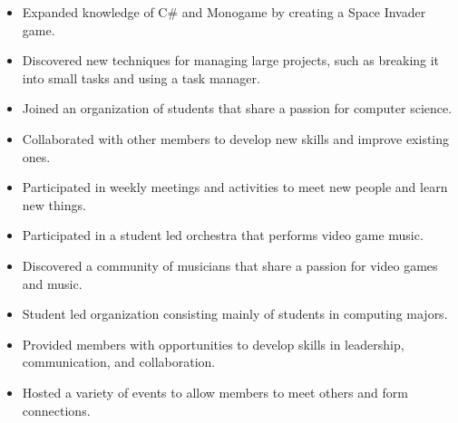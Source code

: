 \documentclass[10pt,a4paper,ragged2e,withhyper]{altacv}
\begin{document}
\begin{paracol}{2}
\divider

\begin{itemize}
  \item Expanded knowledge of C\# and Monogame by creating a Space Invader game.
  \item Discovered new techniques for managing large projects, such as breaking it into small tasks and using a task manager.
\end{itemize}

\switchcolumn


\divider


\medskip

\begin{itemize}
  \item Joined an organization of students that share a passion for computer science.
  \item Collaborated with other members to develop new skills and improve existing ones.
  \item Participated in weekly meetings and activities to meet new people and learn new things.
\end{itemize}

\divider

\begin{itemize}
  \item Participated in a student led orchestra that performs video game music.
  \item Discovered a community of musicians that share a passion for video games and music.
\end{itemize}

\divider

\begin{itemize}
  \item Student led organization consisting mainly of students in computing majors.
  \item Provided members with opportunities to develop skills in leadership, communication, and collaboration.
  \item Hosted a variety of events to allow members to meet others and form connections.
\end{itemize}


\end{paracol}
\end{document}
